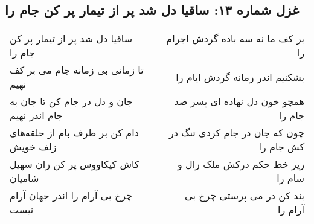 \begin{center}
\section*{غزل شماره ۱۳: ساقیا دل شد پر از تیمار پر کن جام را}
\label{sec:013}
\begin{longtable}{l p{0.5cm} r}
ساقیا دل شد پر از تیمار پر کن جام را
&&
بر کف ما نه سه باده گردش اجرام را
\\
تا زمانی بی زمانه جام می بر کف نهیم
&&
بشکنیم اندر زمانه گردش ایام را
\\
جان و دل در جام کن تا جان به جام اندر نهیم
&&
همچو خون دل نهاده ای پسر صد جام را
\\
دام کن بر طرف بام از حلقه‌های زلف خویش
&&
چون که جان در جام کردی تنگ در کش جام را
\\
کاش کیکاووس پر کن زان سهیل شامیان
&&
زیر خط حکم درکش ملک زال و سام را
\\
چرخ بی آرام را اندر جهان آرام نیست
&&
بند کن در می پرستی چرخ بی آرام را
\\
\end{longtable}
\end{center}

